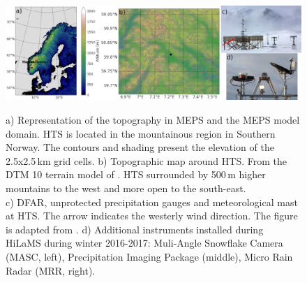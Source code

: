 \documentclass{ametsocV5}
\begin{document}
\begin{figure}[t]
	\noindent\includegraphics[width=\textwidth,angle=0]{fig1.jpg}\\
	\caption{
		a) Representation of the topography in MEPS and the MEPS model domain. HTS is located in the mountainous region in Southern Norway. The contours and shading present the elevation of the 2.5x2.5\,km grid cells. b) Topographic map around HTS. From the DTM 10 terrain model of \protect\citet{geonorge_dtm_2018}. HTS surrounded by 500\,m higher mountains to the west and more open to the south-east. \\ 
		c) DFAR, unprotected precipitation gauges and meteorological mast at HTS. The arrow indicates the westerly wind direction. The figure is adapted from \protect\citet{wolff_derivation_2015}. d) Additional instruments installed during HiLaMS during winter 2016-2017: Muli-Angle Snowflake Camera (MASC, left), Precipitation Imaging Package (middle), Micro Rain Radar (MRR, right).
	}
	\label{fig:norway_map}
\end{figure}
\end{document}
